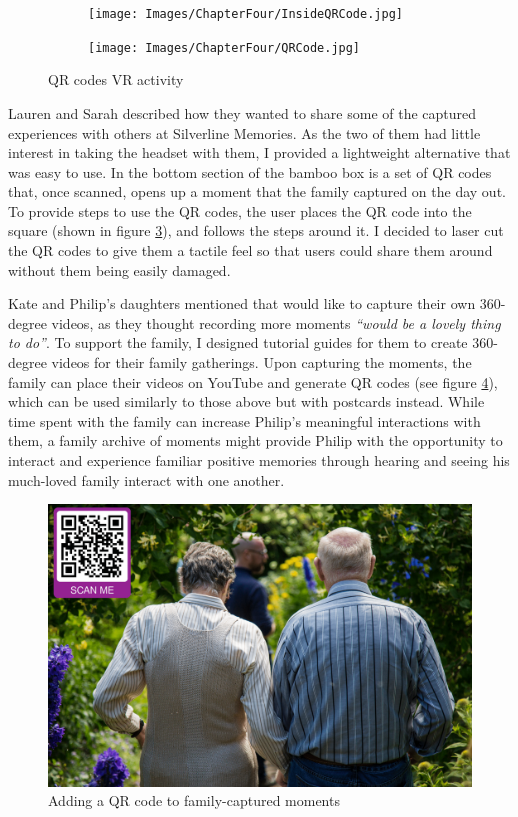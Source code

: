 \begin{figure}[htp]
\centering
\begin{subfigure}{.5\textwidth}
  \centering
  \texttt{[image: Images/ChapterFour/InsideQRCode.jpg]}
  \label{fig:insideQRBox}
\end{subfigure}%
\begin{subfigure}{.5\textwidth}
  \centering
  \texttt{[image: Images/ChapterFour/QRCode.jpg]}
  \label{fig:QRCode}
\end{subfigure}
\caption{QR codes VR activity}
\label{fig:QRcodes}
\end{figure}
Lauren and Sarah described how they wanted to share some of the captured experiences with others at Silverline Memories. As the two of them had little interest in taking the headset with them, I provided a lightweight alternative that was easy to use. In the bottom section of the bamboo box is a set of QR codes that, once scanned, opens up a moment that the family captured on the day out. To provide steps to use the QR codes, the user places the QR code into the square (shown in figure \ref{fig:QRcodes}), and follows the steps around it. I decided to laser cut the QR codes to give them a tactile feel so that users could share them around without them being easily damaged.

Kate and Philip's daughters mentioned that would like to capture their own 360-degree videos, as they thought recording more moments \textit{``would be a lovely thing to do''}. To support the family, I designed tutorial guides for them to create 360-degree videos for their family gatherings. Upon capturing the moments, the family can place their videos on YouTube and generate QR codes (see figure \ref{fig:QRCode-Captured}), which can be used similarly to those above but with postcards instead. While time spent with the family can increase Philip’s meaningful interactions with them, a family archive of moments might provide Philip with the opportunity to interact and experience familiar positive memories through hearing and seeing his much-loved family interact with one another.

\begin{figure}[htp]
\centering
\includegraphics[width=.6\linewidth]{Images/ChapterFour/QRScanPhoto.png}
\caption{Adding a QR code to family-captured moments}
\label{fig:QRCode-Captured}
\end{figure}

